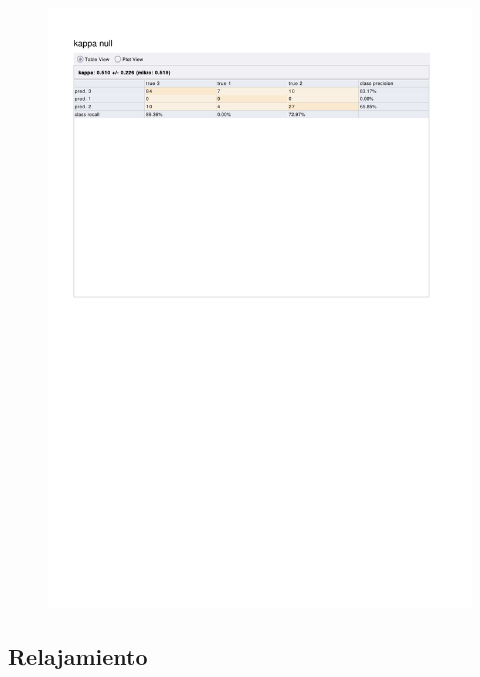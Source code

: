 \begin{figure}[htp]
  \centerline{\includegraphics[trim=0 680 0 80,clip,width=16.09cm]{results/ANN_K_Frustration.pdf}} \caption{
} \label{ANN_K_Frustration}
\end{figure}

\clearpage
\FloatBarrier
\subsection{Relajamiento}


